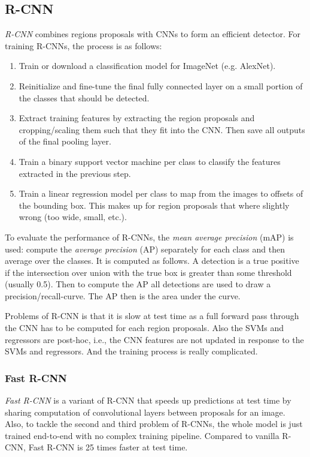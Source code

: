		\subsection{R-CNN}
			\emph{R-CNN} combines regions proposals with CNNs to form an efficient detector. For training R-CNNs, the process is as follows:
			\begin{enumerate}
				\item Train or download a classification model for ImageNet (e.g. AlexNet).
				\item Reinitialize and fine-tune the final fully connected layer on a small portion of the classes that should be detected.
				\item Extract training features by extracting the region proposals and cropping/scaling them such that they fit into the CNN. Then save all outputs of the final pooling layer.
				\item Train a binary support vector machine per class to classify the features extracted in the previous step.
				\item Train a linear regression model per class to map from the images to offsets of the bounding box. This makes up for region proposals that where slightly wrong (too wide, small, etc.).
			\end{enumerate}
			To evaluate the performance of R-CNNs, the \emph{mean average precision} (mAP) is used: compute the \emph{average precision} (AP) separately for each class and then average over the classes. It is computed as follows. A detection is a true positive if the intersection over union with the true box is greater than some threshold (usually \num{0.5}). Then to compute the AP all detections are used to draw a precision/recall-curve. The AP then is the area under the curve.

			Problems of R-CNN is that it is slow at test time as a full forward pass through the CNN has to be computed for each region proposals. Also the SVMs and regressors are post-hoc, i.e., the CNN features are not updated in response to the SVMs and regressors. And the training process is really complicated.

			\subsubsection{Fast R-CNN}
				\emph{Fast R-CNN} is a variant of R-CNN that speeds up predictions at test time by sharing computation of convolutional layers between proposals for an image. Also, to tackle the second and third problem of R-CNNs, the whole model is just trained end-to-end with no complex training pipeline. Compared to vanilla R-CNN, Fast R-CNN is \num{25} times faster at test time.

